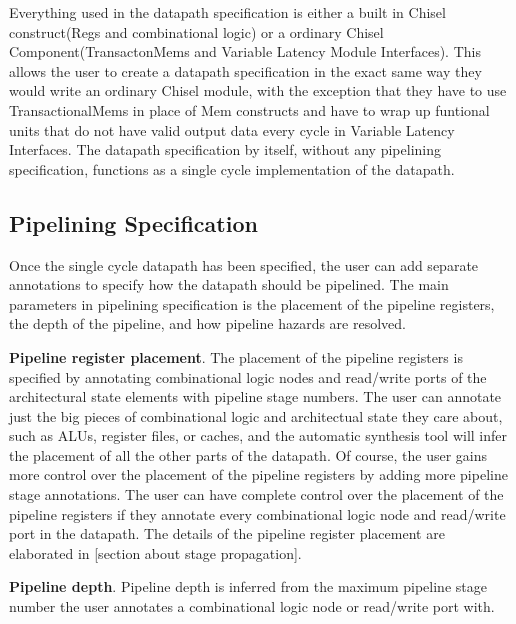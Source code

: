 Everything used in the datapath specification is either a built in
Chisel construct(Regs and combinational logic) or a ordinary Chisel
Component(TransactonMems and Variable Latency Module Interfaces). This
allows the user to create a datapath specification in the exact same
way they would write an ordinary Chisel module, with the exception
that they have to use TransactionalMems in place of Mem constructs and
have to wrap up funtional units that do not have valid output data
every cycle in Variable Latency Interfaces. The datapath specification
by itself, without any pipelining specification, functions as a single
cycle implementation of the datapath.

\subsection {Pipelining Specification}
Once the single cycle datapath has been specified, the user can add
separate annotations to specify how the datapath should be
pipelined. The main parameters in pipelining specification is the
placement of the pipeline registers, the depth of the pipeline, and
how pipeline hazards are resolved.

{\bf Pipeline register placement}. The placement of the pipeline
registers is specified by annotating combinational logic nodes and
read/write ports of the architectural state elements with pipeline
stage numbers. The user can annotate just the big pieces of combinational
logic and architectual state they care about, such as ALUs, register
files, or caches, and the automatic synthesis tool will infer the
placement of all the other parts of the datapath. Of course, the user
gains more control over the placement of the pipeline registers by
adding more pipeline stage annotations. The user can have complete
control over the placement of the pipeline registers if they annotate
every combinational logic node and read/write port in the datapath. The details of the pipeline
register placement are elaborated in [section about stage
  propagation].

{\bf Pipeline depth}. Pipeline depth is inferred from the maximum
pipeline stage number the user annotates a combinational logic node or
read/write port with.


